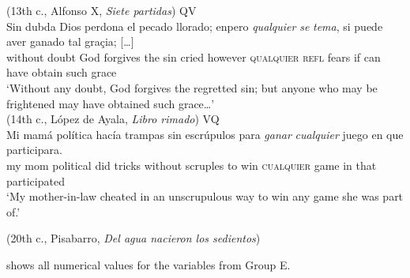     (13{th} c., Alfonso X, \textit{Siete partidas})
\ex QV\\
    \gll Sin dubda Dios perdona el pecado llorado; enpero \textit{qualquier} \textit{se} \textit{tema}, si puede aver ganado tal graçia; […]\\
without doubt God forgives the sin cried however \textsc{qualquier} \textsc{refl} fears if can have obtain such grace\\
    \glt ‘Without any doubt, God forgives the regretted sin; but anyone who may be frightened may have obtained such grace…’\\

    (14{th} c., López de Ayala, \textit{Libro rimado})
\newpage
 \ex  VQ\\
\gll Mi mamá política hacía trampas sin escrúpulos para \textit{ganar} \textit{cualquier} juego en que participara.\\
my mom political did tricks without scruples to win \textsc{cualquier} game in that participated\\
    \glt ‘My mother-in-law cheated in an unscrupulous way to win any game she was part of.’ 


    (20{th} c., Pisabarro, \textit{Del agua nacieron los sedientos})
\z
\z

 shows all numerical values for the variables from Group E.

